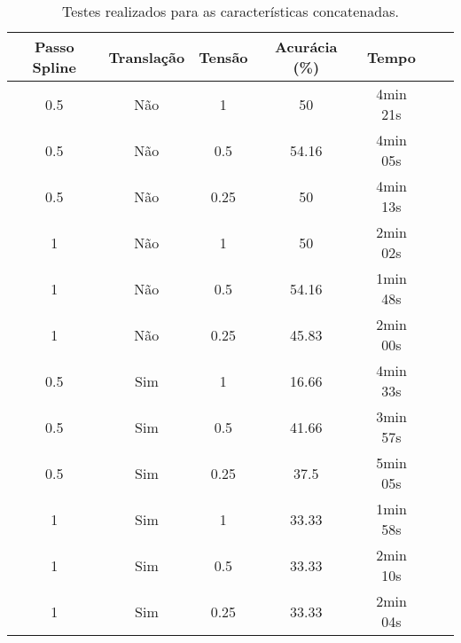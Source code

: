 \begin{table}[h!]
    \centering
    \caption{Testes realizados para as características concatenadas.}
    \begin{tabular}{|c|c|c|c|c|c|c|}
    \hline
    \textbf{Passo Spline} & \textbf{Translação} & \textbf{Tensão} & \textbf{Acurácia (\%)} & \textbf{Tempo} \\
    \hline
    0.5 & Não & 1 & 50 & 4min 21s\\
    0.5 & Não & 0.5 & 54.16 & 4min 05s\\
    0.5 & Não & 0.25 & 50 & 4min 13s\\

    1 & Não & 1 & 50 & 2min 02s\\
    1 & Não & 0.5 & 54.16 & 1min 48s\\
    1 & Não & 0.25 & 45.83 & 2min 00s\\

    0.5 & Sim & 1 & 16.66 & 4min 33s \\
    0.5 & Sim & 0.5 & 41.66 & 3min 57s \\
    0.5 & Sim & 0.25 & 37.5 & 5min 05s\\

    1 & Sim & 1 & 33.33 & 1min 58s \\
    1 & Sim & 0.5 & 33.33 & 2min 10s \\
    1 & Sim & 0.25 & 33.33 & 2min 04s \\
    \hline
    \end{tabular}
\end{table}

